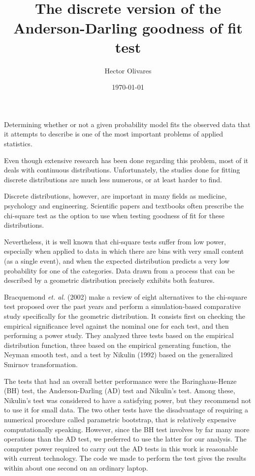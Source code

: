 \documentclass[paper=letter, fontsize=12pt]{scrartcl}
\title{	
\normalfont \normalsize 
\horrule{0.5pt} \\[0.4cm] %
\huge The discrete version of the Anderson-Darling goodness of fit test
\horrule{2pt} \\[0.5cm] %
}
\author{Hector Olivares}
\date{\normalsize\today}
\numberwithin{equation}{section}
\numberwithin{figure}{section}
\begin{document}
\maketitle


Determining whether or not a given probability model fits the observed
 data that it attempts to describe is one of the most important problems of applied statistics.

Even though extensive research has been done regarding this problem, most of it deals with
 continuous distributions. Unfortunately, the studies done for fitting discrete distributions
 are much less numerous, or at least harder to find.

Discrete distributions, however, are important in many fields as medicine, psychology and
 engineering. Scientific papers and textbooks
 often prescribe the chi-square test as the option to use when testing goodness of fit 
 for these distributions.
 
Nevertheless, it is well known that chi-square tests suffer from low power, especially when
 applied to data in which there are bins with very small content (as a single event),
 and when the expected distribution predicts a very low probability for one of the categories.
 Data drawn from a process that can be described by a geometric distribution precisely
 exhibits both features.

 Bracquemond {\it et. al.} (2002) \cite{BraCreGau} make a review of eight alternatives to the chi-square test
 proposed over the past years and perform a simulation-based
 comparative
 study specifically for the geometric distribution. It consists first on checking the
 empirical significance level against the nominal one for each test, and then performing
 a power study. They analyzed three tests based on the empirical distribution function,
 three based on the empirical generating function, the Neyman smooth test, 
 and a test by Nikulin (1992) \cite{Nikulin} based on the generalized Smirnov transformation.
 
The tests that had an overall better performance were the Baringhaus-Henze (BH) test,
 the Anderson-Darling (AD) test and Nikulin's test. Among these, Nikulin's test was considered
 to have a satisfying power, but they recommend not to use it for small data.
 The two other tests have the disadvantage of requiring a numerical procedure called
 parametric bootstrap, that is relatively expensive computationally speaking.
 However, since the BH test involves by far many more operations than the AD test,
 we preferred to use the latter for our analysis.
 The computer power required to carry out the AD tests in this work is reasonable with
 current technology. The code we made to perform the test gives the results within about
 one second on an ordinary laptop.
\end{document}
